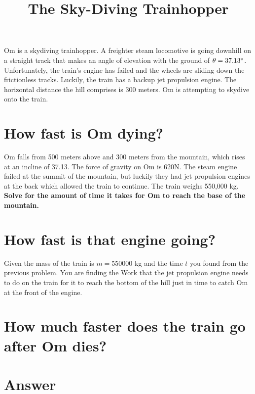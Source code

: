\documentclass{article}
\title{\vspace{-3em}The Sky-Diving Trainhopper\vspace{-3em}}
\begin{document}
\fontsize{14}{16}\selectfont

\maketitle

Om is a skydiving trainhopper. A freighter steam locomotive is going downhill on a straight track that makes an angle of elevation with the ground of $\theta=37.13\degree$. Unfortunately, the train's engine has failed and the wheels are sliding down the frictionless tracks. Luckily, the train has a backup jet propulsion engine. The horizontal distance the hill comprises is 300 meters. Om is attempting to skydive onto the train.

\section{How fast is Om dying?}

Om falls from 500 meters above and 300 meters from the mountain, which rises at an incline of 37.13\degree. The force of gravity on Om is 620N. The steam engine failed at the summit of the mountain, but luckily they had jet propulsion engines at the back which allowed the train to continue. The train weighs 550,000 kg. \textbf{Solve for the amount of time it takes for Om to reach the base of the mountain.}


\section{How fast is that engine going?}
Given the mass of the train is $m=550000$ kg and the time $t$ you found from the previous problem. You are finding the Work that the jet propulsion engine needs to do on the train for it to reach the bottom of the hill just in time to catch Om at the front of the engine.

\section{How much faster does the train go after Om dies?}

\pagebreak

\section{Answer}
\end{document}
